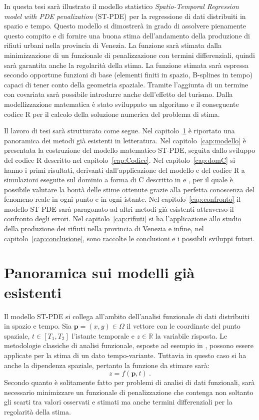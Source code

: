 \documentclass[a4paper,11pt,twoside,openright]{book}							%
\begin{document}
In questa tesi sarà illustrato il modello statistico \textit{Spatio-Temporal Regression model with PDE penalization} (ST-PDE) per la regressione di dati distribuiti in spazio e tempo. Questo modello si dimostrerà in grado di assolvere pienamente questo compito e di fornire una buona stima dell'andamento della produzione di rifiuti urbani nella provincia di Venezia. La funzione sarà stimata dalla minimizzazione di un funzionale di penalizzazione con termini differenziali, quindi sarà garantita anche la regolarità della stima. La funzione stimata sarà espressa secondo opportune funzioni di base (elementi finiti in spazio, B-splines in tempo) capaci di tener conto della geometria spaziale. Tramite l'aggiunta di un termine con covariata sarà possibile introdurre anche dell'effetto del turismo. Dalla modellizzazione matematica è stato sviluppato un algoritmo e il conseguente codice R per il calcolo della soluzione numerica del problema di stima. 

Il lavoro di tesi sarà strutturato come segue. Nel capitolo~\ref{cap:panoramica} è riportato una panoramica dei metodi già esistenti in letteratura. Nel capitolo~\ref{cap:modello} è presentata la costruzione del modello matematico ST-PDE, seguita dallo sviluppo del codice R descritto nel capitolo~\ref{cap:Codice}. Nel capitolo~\ref{cap:domC} si hanno i primi risultati, derivanti dall'applicazione del modello e del codice R a simulazioni eseguite sul dominio a forma di C descritto in \cite{art:ramsay} e \cite{art:wood}, per il quale è possibile valutare la bontà delle stime ottenute grazie alla perfetta conoscenza del fenomeno reale in ogni punto e in ogni istante. Nel capitolo~\ref{cap:confronto} il modello ST-PDE sarà paragonato ad altri metodi già esistenti attraverso il confronto degli errori. Nel capitolo~\ref{cap:rifiuti} si ha l'applicazione allo studio della produzione dei rifiuti nella provincia di Venezia e infine, nel capitolo~\ref{cap:conclusione}, sono raccolte le conclusioni e i possibili sviluppi futuri.
\newpage
\thispagestyle{empty}

\chapter{Panoramica sui modelli già esistenti}
\label{cap:panoramica}

Il modello ST-PDE si collega all'ambito dell'analisi funzionale di dati distribuiti in spazio e tempo. Sia $\bm p = (x,y) \in \Omega$ il vettore con le coordinate del punto spaziale, $t \in [T_1,T_2]$ l'istante temporale e $z \in \mathbb{R}$ la variabile risposta. Le metodologie classiche di analisi funzionale, esposte ad esempio in \cite{art:ramsaysilverman}, possono essere applicate per la stima di un dato tempo-variante. Tuttavia in questo caso si ha anche la dipendenza spaziale, pertanto la funzione da stimare sarà:
$$
z=f(\bm p,t) \ .
$$
Secondo quanto è solitamente fatto per problemi di analisi di dati funzionali, sarà necessario minimizzare un funzionale di penalizzazione che contenga non soltanto gli scarti tra valori osservati e stimati ma anche termini differenziali per la regolarità della stima.
\end{document}

